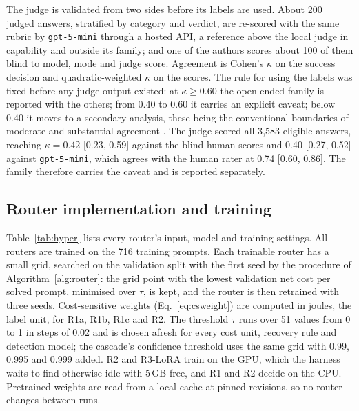 \documentclass[final,5p,times,twocolumn]{elsarticle}
\theoremstyle{plain}
\begin{document}
The judge is validated from two sides before its labels are used. About 200
judged answers, stratified by category and verdict, are re-scored with the
same rubric by \texttt{gpt-5-mini} through a hosted API, a reference above
the local judge in capability and outside its family; and one of the authors
scores about 100 of them blind to model, mode and judge score. Agreement is
Cohen's $\kappa$ \cite{cohen1960kappa} on the success decision and
quadratic-weighted $\kappa$ \cite{cohen1968weighted} on the scores. The rule
for using the labels was fixed before any judge output existed: at
$\kappa \geq 0.60$ the open-ended family is reported with the others; from
0.40 to 0.60 it carries an explicit caveat; below 0.40 it moves to a
secondary analysis, these being the conventional boundaries of moderate and
substantial agreement \cite{landis1977measurement}. The judge scored all
3{,}583 eligible answers, reaching $\kappa = 0.42$ [0.23, 0.59] against the
blind human scores and 0.40 [0.27, 0.52] against \texttt{gpt-5-mini}, which
agrees with the human rater at 0.74 [0.60, 0.86].
The family therefore carries the caveat and is reported separately.

\subsection{Router implementation and training}
\label{sec:setup-routers}

Table~\ref{tab:hyper} lists every router's input, model and training settings.
All routers are trained on the 716 training prompts. Each trainable router
has a small grid, searched on the validation split with the first seed by the
procedure of Algorithm~\ref{alg:router}: the grid point with the lowest
validation net cost per solved prompt, minimised over $\tau$, is kept, and
the router is then retrained with three seeds. Cost-sensitive weights
(Eq.~\ref{eq:csweight}) are computed in joules, the label unit, for R1a, R1b,
R1c and R2. The threshold $\tau$ runs over 51 values from 0 to 1 in steps of
0.02 and is chosen afresh for every cost unit, recovery rule and detection
model; the cascade's confidence threshold uses the same grid with 0.99,
0.995 and 0.999 added. R2 and R3-LoRA train on the GPU, which the harness
waits to find otherwise idle with 5\,GB free, and R1 and R2 decide on the CPU.
Pretrained weights are read from a local cache at pinned revisions, so no
router changes between runs.
\end{document}
